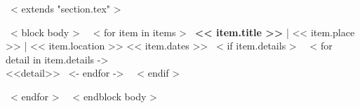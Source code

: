 ~< extends "section.tex" >~

~< block body >~
    ~< for item in items >~
      \textbf{<< item.title >>} | << item.place >> | << item.location >> \hfill << item.dates >>
        ~< if item.details >~
            ~< for detail in item.details ->~
                ~\\ <<detail>>
            ~<- endfor ->~
        ~< endif >~
        \par
    ~< endfor >~
~< endblock body >~
